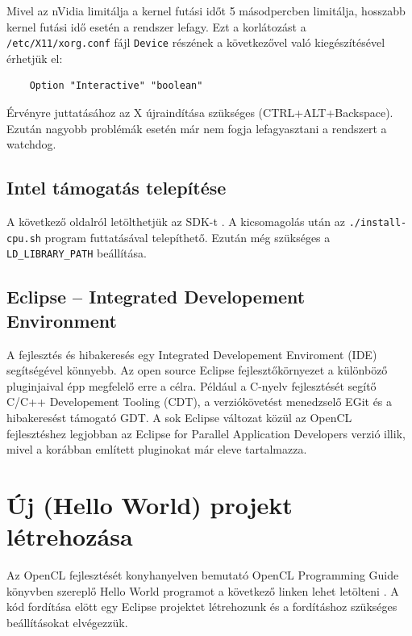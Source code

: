 	Mivel az nVidia limitálja a kernel futási időt 5 másodpercben limitálja,
	hosszabb kernel futási idő esetén a rendszer lefagy.
	Ezt a korlátozást a \texttt{/etc/X11/xorg.conf} fájl \texttt{Device} részének a
	következővel való kiegészítésével érhetjük el:
	\begin{lstlisting}
	Option "Interactive" "boolean"
	\end{lstlisting}
	Érvényre juttatásához az X újraindítása szükséges (CTRL+ALT+Backspace).
	Ezután nagyobb problémák esetén már nem fogja lefagyasztani a rendszert a
	watchdog.

\subsection{Intel támogatás telepítése}
	A következő oldalról letölthetjük az SDK-t \cite{intel-sdk}.
	A kicsomagolás után az \texttt{./install-cpu.sh} program futtatásával
	telepíthető.
	Ezután még szükséges a \texttt{LD\_LIBRARY\_PATH} beállítása.

\subsection{Eclipse – Integrated Developement Environment}
	A fejlesztés és hibakeresés egy Integrated Developement Enviroment (IDE)
	segítségével könnyebb.
	Az open source Eclipse \cite{eclipse} fejlesztőkörnyezet a különböző pluginjaival épp
	megfelelő erre a célra.
	Például a C-nyelv fejlesztését segítő C/C++ Developement Tooling (CDT),
	a verziókövetést menedzselő EGit és a hibakeresést támogató GDT.
	A sok Eclipse változat közül az OpenCL fejlesztéshez legjobban az
	Eclipse for Parallel Application Developers verzió illik, mivel a korábban említett pluginokat már eleve tartalmazza.


\section{Új (Hello World) projekt létrehozása}
	Az OpenCL fejlesztését konyhanyelven bemutató OpenCL Programming Guide \cite{Munshi2011}
	könyvben szereplő Hello World programot a következő linken lehet letölteni
	\cite{hellow}.
	A kód fordítása elött egy Eclipse projektet létrehozunk és a
	fordításhoz szükséges beállításokat elvégezzük.

